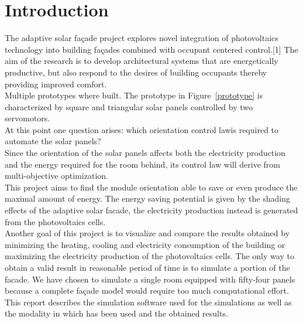 \chapter{Introduction}

The adaptive solar fa\c{c}ade project explores novel integration of photovoltaics technology into building fa\c{c}ades combined with occupant centered control.[1] The aim of the research is to develop architectural systems that are energetically productive, but also respond to the desires of building occupants thereby providing improved comfort.\\
Multiple prototypes where built. The prototype in Figure~\ref{prototype} is characterized by square and triangular solar panels controlled by two servomotors. \\
At this point one question arises: which orientation control lawis required to automate the solar panels?\\
Since the orientation of the solar panels affects both the electricity production and the energy required for the room behind, its control law will derive from multi-objective optimization.\\
This project aims to find the module orientation able to save or even produce the maximal amount of energy.
The energy saving potential is given by the shading effects of the adaptive solar facade, the electricity production instead is generated from the photovoltaics cells. \\
Another goal of this project is to visualize and compare the results obtained by minimizing the heating, cooling and electricity consumption of the building or maximizing the electricity production of the photovoltaics cells.
The only way to obtain a valid result in reasonable period of time is to simulate a portion of the facade. We have chosen to simulate a single room equipped with fifty-four panels because a complete fa\c{c}ade model would require too much computational effort.
This report describes the simulation software used for the simulations as well as the modality in which has been used and the obtained results.\\

